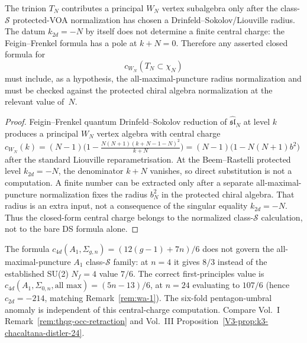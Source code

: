 \begin{proposition}
\label{prop:wa-WN-central-charge}
The trinion $T_N$ contributes a principal $W_N$ vertex subalgebra only
after the class-$\mathcal S$ protected-VOA normalization has chosen a
Drinfeld--Sokolov/Liouville radius.  The datum $k_{2d}=-N$ by itself
does not determine a finite central charge: the Feigin--Frenkel
formula has a pole at $k+N=0$.  Therefore any asserted closed formula
for
\[
 c_{W_N}(T_N\subset \chi_N)
\]
must include, as a hypothesis, the all-maximal-puncture radius
normalization and must be checked against the protected chiral algebra
normalization at the relevant value of~$N$.
\end{proposition}

\begin{proof}
Feigin--Frenkel quantum Drinfeld--Sokolov reduction of
$\widehat{\mathfrak{sl}}_N$ at level $k$ produces a principal $W_N$
vertex algebra with central charge
$c_{W_N}(k) = (N - 1)\bigl(1 - \frac{N(N+1)(k + N - 1 - N)^2}{k + N}\bigr)
 = (N - 1)\bigl(1 - N(N+1)b^2\bigr)$
after the standard Liouville reparametrisation.  At the Beem--Rastelli
protected level $k_{2d}=-N$, the denominator $k+N$ vanishes, so direct
substitution is not a computation.  A finite number can be extracted
only after a separate all-maximal-puncture normalization fixes the
radius $b_N^2$ in the protected chiral algebra.  That radius is an
extra input, not a consequence of the singular equality $k_{2d}=-N$.
Thus the closed-form central charge belongs to the normalized
class-$\mathcal S$ calculation, not to the bare DS formula alone.
\end{proof}

\begin{remark}
\label{rem:wa-retraction}
The formula
$c_{4d}(A_1, \Sigma_{g,n}) = (12(g-1) + 7n)/6$
does not govern the all-maximal-puncture $A_1$ class-$\mathcal S$
family: at $n=4$ it gives $8/3$ instead of the
established SU(2) $N_f = 4$ value $7/6$. The correct
first-principles value is
$c_{4d}(A_1, \Sigma_{0,n}, \text{all max}) = (5n - 13)/6$, at
$n = 24$ evaluating to $107/6$ (hence $c_{2d} = -214$, matching
Remark~\ref{rem:wa-1}). The six-fold pentagon-umbral anomaly is
independent of this central-charge computation.
Compare
Vol.~I
Remark~\ref{rem:thqg-occ-retraction} and Vol.~III
Proposition~\ref{V3-prop:k3-chacaltana-distler-24}.
\end{remark}

